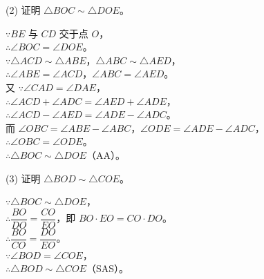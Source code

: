\documentclass{exam-zh}
\begin{document}
\begin{eduSubQuestionItem}{(2)}
证明 $\triangle BOC\sim\triangle DOE$。\end{eduSubQuestionItem}

\begin{eduDualExplain}
  \begin{eduExplainLeft}
  \end{eduExplainLeft}

  \begin{eduExplainRight}
      {$\because BE$ 与 $CD$ 交于点 $O$，\\
$\therefore \angle BOC=\angle DOE$。\\
$\because \triangle ACD\sim\triangle ABE$，$\triangle ABC\sim\triangle AED$，\\
$\therefore \angle ABE=\angle ACD$，$\angle ABC=\angle AED$。\\
又 $\because \angle CAD=\angle DAE$，\\
$\therefore \angle ACD+\angle ADC=\angle AED+\angle ADE$，\\
$\therefore \angle ACD-\angle AED=\angle ADE-\angle ADC$。\\
而 $\angle OBC=\angle ABE-\angle ABC$，$\angle ODE=\angle ADE-\angle ADC$，\\
$\therefore \angle OBC=\angle ODE$。\\
$\therefore \triangle BOC\sim\triangle DOE$（AA）。
}
  \end{eduExplainRight}
\end{eduDualExplain}




\begin{eduSubQuestionItem}{(3)}
证明 $\triangle BOD\sim\triangle COE$。\end{eduSubQuestionItem}

\begin{eduDualExplain}
  \begin{eduExplainLeft}
  \end{eduExplainLeft}

  \begin{eduExplainRight}
      {$\because \triangle BOC\sim\triangle DOE$，\\
$\therefore \dfrac{BO}{DO}=\dfrac{CO}{EO}$，即 $BO\cdot EO=CO\cdot DO$。\\
$\therefore \dfrac{BO}{CO}=\dfrac{DO}{EO}$。\\
$\because \angle BOD=\angle COE$，\\
$\therefore \triangle BOD\sim\triangle COE$（SAS）。
}
  \end{eduExplainRight}
\end{eduDualExplain}
\end{document}
